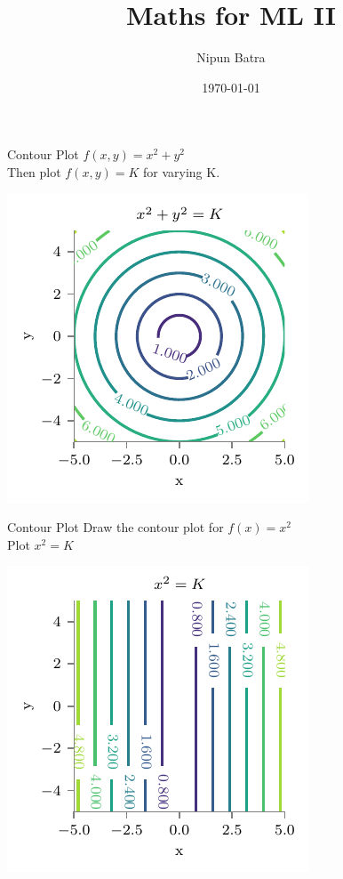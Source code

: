 \documentclass{beamer}
\title{Maths for ML II}
\date{\today}
\author{Nipun Batra}
\institute{IIT Gandhinagar}
\begin{document}
  \maketitle
  
  
  

\begin{frame}{Contour Plot}
 $f(x,y) = x^{2} + y^{2}$\\
 Then plot $f(x,y)=K$ for varying K.
 \begin{center}
     \includegraphics{ml-maths/contour-plot-1.pdf}
 \end{center}
 
\end{frame}





\begin{frame}{Contour Plot}
    Draw the contour plot for $f(x) = x^{2}$\\
    Plot $x^{2}=K$
     \begin{center}
     \includegraphics{ml-maths/contour-plot-2.pdf}
 \end{center}
 
\end{frame}
\end{document}
